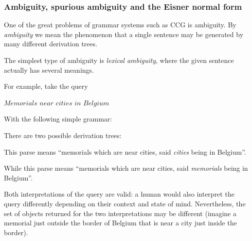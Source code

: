 \documentclass[main.tex]{subfiles}
\begin{document}
\subsubsection{Ambiguity, spurious ambiguity and the Eisner normal form}
One of the great problems of grammar systems such as CCG is ambiguity.
By \emph{ambiguity} we mean the phenomenon that a single sentence may be
generated by many different derivation trees.

The simplest type of ambiguity is \emph{lexical ambiguity}, where the given
sentence actually has several meanings.

\begin{example}
    For example, take the query
    \begin{center}
        $Memorials$ $near$ $cities$ $in$ $Belgium$
    \end{center}
    With the following simple grammar:


    There are two possible derivation trees:


    This parse means ``memorials which are near cities, said \emph{cities} being
    in Belgium''.


    While this parse means ``memorials which are near cities, said \emph{memorials}
    being in Belgium''.

    Both interpretations of the query are valid: a human would also interpret
    the query differently depending on their context and state of mind.
    Nevertheless, the set of objects returned for the two interpretations may
    be different (imagine a memorial just outside the border of Belgium
    that is near a city just inside the border).
\end{example}
\end{document}
